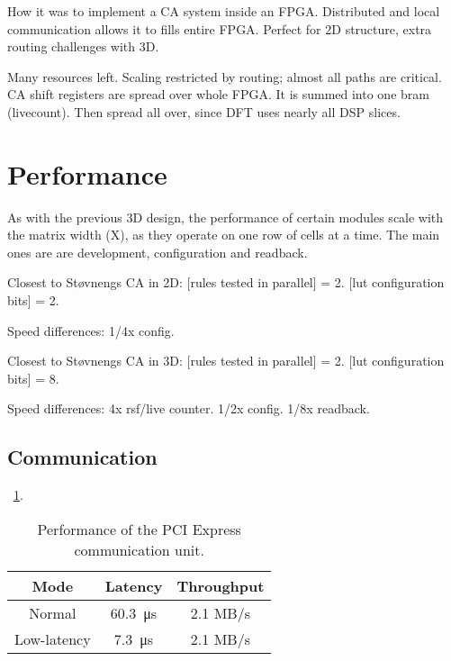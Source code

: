 \TODO
How it was to implement a CA system inside an FPGA.
Distributed and local communication allows it to fills entire FPGA.
Perfect for 2D structure, extra routing challenges with 3D.

\TODO
Many resources left.
Scaling restricted by routing; almost all paths are critical.
CA shift registers are spread over whole FPGA.
It is summed into one bram (livecount).
Then spread all over, since DFT uses nearly all DSP slices.


\section{Performance}

\TODO

As with the previous 3D design, the performance of certain modules scale with the matrix width (X), as they operate on one row of cells at a time.
The main ones are are development, configuration and readback.

Closest to Støvnengs CA in 2D:
[rules tested in parallel] = 2.
[lut configuration bits] = 2.

Speed differences:
1/4x config.

Closest to Støvnengs CA in 3D:
[rules tested in parallel] = 2.
[lut configuration bits] = 8.

Speed differences:
4x rsf/live counter.
1/2x config.
1/8x readback.


\subsection{Communication}

\TODO
\tablename~\ref{tab:communication-performance}.

\begin{table}[!ht]
    \renewcommand{\arraystretch}{1.4}
    \centering
    \begin{tabular}{c|c|c}
        \bfseries Mode & \bfseries Latency & \bfseries Throughput \\
        \hline
        Normal & \SI{60.3}{\micro\second} & 2.1 MB/s \\
        Low-latency & \SI{7.3}{\micro\second} & 2.1 MB/s \\
    \end{tabular}
    \caption[Communication performance]{
        Performance of the PCI Express communication unit.
    }
    \label{tab:communication-performance}
\end{table}

